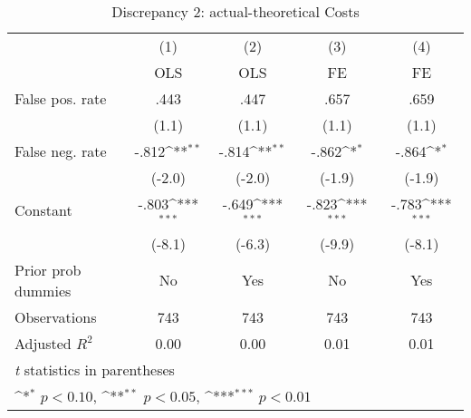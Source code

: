 \begin{table}[htbp]\centering
\def\sym#1{\ifmmode^{#1}\else\(^{#1}\)\fi}
\caption{Discrepancy 2: actual-theoretical Costs}
\begin{tabular}{l*{4}{c}}
\hline\hline
                &\multicolumn{1}{c}{(1)}&\multicolumn{1}{c}{(2)}&\multicolumn{1}{c}{(3)}&\multicolumn{1}{c}{(4)}\\
                &\multicolumn{1}{c}{OLS}&\multicolumn{1}{c}{OLS}&\multicolumn{1}{c}{FE}&\multicolumn{1}{c}{FE}\\
\hline
False pos. rate &     .443         &     .447         &     .657         &     .659         \\
                &    (1.1)         &    (1.1)         &    (1.1)         &    (1.1)         \\
False neg. rate &    -.812\sym{**} &    -.814\sym{**} &    -.862\sym{*}  &    -.864\sym{*}  \\
                &   (-2.0)         &   (-2.0)         &   (-1.9)         &   (-1.9)         \\
Constant        &    -.803\sym{***}&    -.649\sym{***}&    -.823\sym{***}&    -.783\sym{***}\\
                &   (-8.1)         &   (-6.3)         &   (-9.9)         &   (-8.1)         \\
Prior prob dummies &       No         &      Yes         &       No         &      Yes         \\
\hline
Observations    &      743         &      743         &      743         &      743         \\
Adjusted \(R^{2}\)&     0.00         &     0.00         &     0.01         &     0.01         \\
\hline\hline
\multicolumn{5}{l}{\footnotesize \textit{t} statistics in parentheses}\\
\multicolumn{5}{l}{\footnotesize \sym{*} \(p<0.10\), \sym{**} \(p<0.05\), \sym{***} \(p<0.01\)}\\
\end{tabular}
\end{table}
